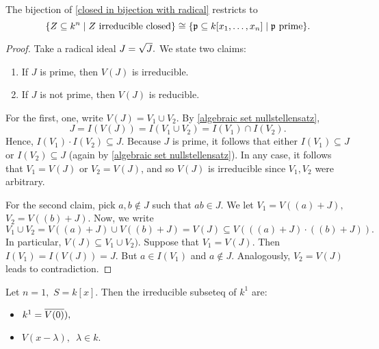 \begin{prop}
  \label{prime irreducible}
  The bijection of \cref{closed in bijection with radical} restricts to
  \[\{Z \subseteq k^n \mathrel{|} \text{$Z$ irreducible closed}\} \cong \{\mathfrak p \subseteq k[x_1, \dotsc, x_n] \mathrel{|} \text{$\mathfrak p $ prime}\}.\]
\end{prop}
\begin{proof}
  Take a radical ideal \(J = \sqrt{J}.\) We state two claims:
  \begin{enumerate}
  \item If \(J\) is prime, then \(V(J)\) is irreducible.
  \item If \(J\) is not prime, then \(V(J)\) is reducible.
  \end{enumerate}
  For the first, one, write \(V(J) = V_1 \cup V_2.\) By \cref{algebraic set nullstellensatz},
  \[J = I(V(J)) = I(V_1 \cup V_2) = I(V_1) \cap I(V_2).\]
  Hence,
  \(I(V_1) \cdot I(V_2) \subseteq J.\)
  Because \(J\) is prime, it follows that either \(I(V_1) \subseteq J\) or \(I(V_2) \subseteq J\) (again by \cref{algebraic set nullstellensatz}).
  In any case, it follows that \(V_1 = V(J)\) or \(V_2 = V(J)\), and so \(V(J)\) is irreducible since \(V_1, V_2\) were arbitrary.

  For the second claim, pick \(a, b \notin J\) such that \(ab \in J\). We let
  \(V_1 = V((a) + J),\)
  \(V_2 = V((b) + J).\)
  Now, we write
  \[V_1 \cup V_2 = V((a) + J) \cup V((b) + J) = V(J) \subseteq V(((a) + J) \cdot ((b) + J)).\]
  In particular,
  \(V(J) \subseteq V_1 \cup V_2).\)
  Suppose that
  \(V_1 = V(J).\) Then \(I(V_1) = I(V(J)) = J.\)
  But \(a \in I(V_1)\) and \(a \notin J\).
  Analogously, \(V_2 = V(J)\) leads to contradiction.
\end{proof}


\begin{example}
  Let \(n = 1,\) \(S = k[x].\) Then the irreducible subseteq of \(k^1\) are:
  \begin{itemize}
  \item \(k^1 = \overline{V(0)}),\)
  \item \(V(x-\lambda), \enspace \lambda \in k.\)
  \end{itemize}
\end{example}

